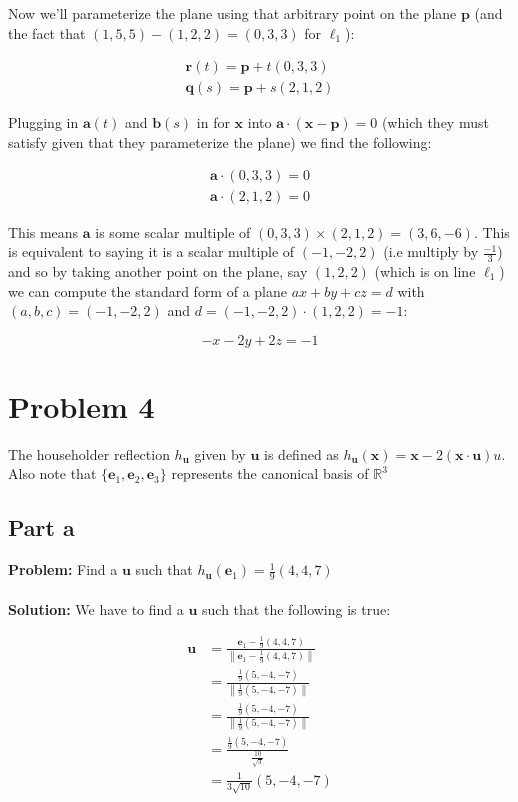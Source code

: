 \documentclass{article}
\begin{document}
Now we'll parameterize the plane using that arbitrary point on the plane $\mathbf p$ (and the fact that $(1,5,5)-(1,2,2)=(0,3,3)$ for $\ell_1$):

\begin{gather*}
  \mathbf r(t)=\mathbf p+t(0,3,3)\\
  \mathbf q(s)=\mathbf p+s(2,1,2)
\end{gather*}

Plugging in $\mathbf a(t)$ and $\mathbf b(s)$ in for $\mathbf x$ into $\mathbf a\cdot(\mathbf x-\mathbf p)=0$ (which they must satisfy given that they parameterize the plane) we find the following:

\begin{gather*}
  \mathbf a\cdot (0,3,3)=0\\
  \mathbf a\cdot (2,1,2)=0
\end{gather*}

This means $\mathbf a$ is some scalar multiple of $(0,3,3)\times(2,1,2)=(3,6,-6)$. This is equivalent to saying it is a scalar multiple of $(-1,-2,2)$ (i.e multiply by $\frac{-1}{3}$) and so by taking another point on the plane, say $(1,2,2)$ (which is on line $\ell_1$) we can compute the standard form of a plane $ax+by+cz=d$ with $(a,b,c)=(-1,-2,2)$ and $d=(-1,-2,2)\cdot(1,2,2)=-1$:

$$-x-2y+2z=-1$$

\section{Problem 4}
The householder reflection $h_\mathbf u$ given by $\mathbf u$ is defined as $h_\mathbf u(\mathbf x)=\mathbf x-2(\mathbf x\cdot\mathbf u)u$. Also note that $\{\mathbf e_1,\mathbf e_2,\mathbf e_3\}$ represents the canonical basis of $\mathbb R^3$
\subsection{Part a}
\textbf{Problem:} Find a $\mathbf u$ such that $h_\mathbf u(\mathbf e_1)=\frac{1}{9}(4,4,7)$
\\\\
\textbf{Solution:} We have to find a $\mathbf u$ such that the following is true:

\begin{align*}
  \mathbf u&=\frac{\mathbf e_1-\frac{1}{9}(4,4,7)}{\left\|\mathbf e_1-\frac{1}{9}(4,4,7)\right\|}\\
  &=\frac{\frac{1}{9}(5,-4,-7)}{\left\|\frac{1}{9}(5,-4,-7)\right\|}\\
  &=\frac{\frac{1}{9}(5,-4,-7)}{\left\|\frac{1}{9}(5,-4,-7)\right\|}\\
  &=\frac{\frac{1}{9}(5,-4,-7)}{\frac{10}{\sqrt 3}}\\
  &=\frac{1}{3\sqrt{10}}(5,-4,-7)
\end{align*}
\end{document}
